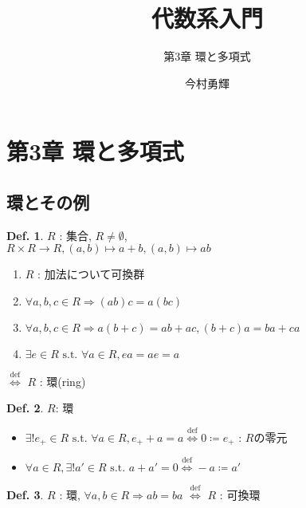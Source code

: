 \documentclass[uplatex,dvipdfmx,9pt]{beamer}
\title{代数系入門}
\subtitle{第3章 環と多項式}
\author{今村勇輝}
\newcommand{\defarrow}{\overset{\mathrm{def}}{\Leftrightarrow}}
\newcommand{\st}{\text{ s.t. }}
\newcommand{\sscount}{\textsection \thesubsection}
\newcounter{textExmCount}
\theoremstyle{definition} %
\newtheorem{defn}{Def.}[subsection] %
\theoremstyle{example}
\begin{document}
  \begin{frame}[plain]
    \titlepage
  \end{frame}

  \section{第3章 環と多項式}

    \subsection{\sscount 環とその例}
    \setcounter{textExmCount}{0}

      \begin{frame}

        \begin{defn}
          $R$ : 集合, $R \ne \emptyset$, \\
          $R \times R \to R, (a, b) \mapsto a + b, (a, b) \mapsto ab$
          \begin{enumerate}
            \item $R$ : 加法について可換群
            \item $\forall a, b, c \in R \Rightarrow (ab)c = a(bc)$
            \item $\forall a, b, c \in R \Rightarrow a(b + c) = ab + ac, (b + c)a = ba + ca$
            \item $\exists e \in R \st \forall a \in R, ea = ae = a$
          \end{enumerate}
          $\defarrow$ $R$ : \alert{環}(ring)
        \end{defn}

        \begin{defn}
          $R$: 環 \\
          \begin{itemize}
            \item $\exists! e_+ \in R \st \forall a \in R, e_+ + a = a \defarrow 0 \coloneqq e_+$ : $R$の\alert{零元}
            \item $\forall a \in R, \exists! a' \in R \st a + a' = 0 \defarrow -a \coloneqq a'$
          \end{itemize}
        \end{defn}

        \begin{defn}
          $R$ : 環, $\forall a, b \in R \Rightarrow ab = ba$ $\defarrow$ $R$ : \alert{可換環}
        \end{defn}

      \end{frame}
\end{document}
